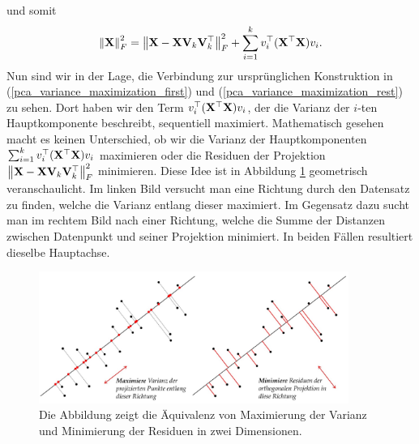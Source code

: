 und somit
\begin{align*}
\left\lVert \mathbf{X} \right\rVert_{F}^{2} = \left\lVert \mathbf{X} - \mathbf{X} \mathbf{V}_k \mathbf{V}_k^{\top} \right\rVert_{F}^{2} + \sum_{i=1}^{k} v_i^{\top} (\mathbf{X}^{\top} \mathbf{X}) v_i.
\end{align*} 
Nun sind wir in der Lage, die Verbindung zur ursprünglichen Konstruktion in (\ref{pca_variance_maximization_first}) und (\ref{pca_variance_maximization_rest}) zu sehen. Dort haben wir den Term $v_i^{\top} (\mathbf{X}^{\top} \mathbf{X}) v_i$, der die Varianz der $i$-ten Hauptkomponente beschreibt, sequentiell maximiert. Mathematisch gesehen macht es keinen Unterschied, ob wir die Varianz der Hauptkomponenten $\sum_{i=1}^{k} v_i^{\top} (\mathbf{X}^{\top} \mathbf{X}) v_i$ maximieren oder die Residuen der Projektion $\left\lVert \mathbf{X} - \mathbf{X} \mathbf{V}_k \mathbf{V}_k^{\top} \right\rVert_{F}^{2}$ minimieren. Diese Idee ist in Abbildung \ref{pca_projection_explanation} geometrisch veranschaulicht. Im linken Bild versucht man eine Richtung durch den Datensatz zu finden, welche die Varianz entlang dieser maximiert. Im Gegensatz dazu sucht man im rechtem Bild nach einer Richtung, welche die Summe der Distanzen zwischen Datenpunkt und seiner Projektion minimiert. In beiden Fällen resultiert dieselbe Hauptachse.

\begin{figure}
\centering
\includegraphics[width = 0.9\textwidth]{figures/pca_projection_explanation_german.jpg}
\caption{Die Abbildung zeigt die Äquivalenz von Maximierung der Varianz und Minimierung der Residuen in zwei Dimensionen.}
\label{pca_projection_explanation}
\end{figure} 


